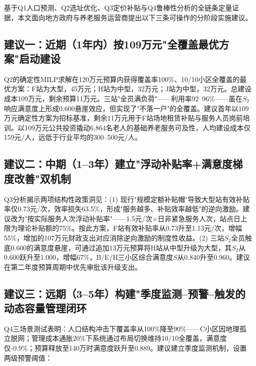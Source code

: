 
基于Q1人口预测、Q2选址优化、Q3定价补贴与Q4鲁棒性分析的全链条定量证据，本文面向地方政府与养老服务运营商提出以下三条可操作的分阶段实施建议。

\subsection{建议一：近期（1年内）按109万元"全覆盖最优方案"启动建设}

Q2的确定性MILP求解在120万元预算内获得覆盖率100\%、10/10小区全覆盖的最优方案：F站为大型，45万元；H站为中型，32万元；J站为中型，32万元。总建设成本109万元，剩余预算11万元。三站"全员满负荷"——利用率92--96\%——虽在$S_2$响应满意度上形成0.600悬崖效应，但实现了"不落一户"的全覆盖。建议首年以109万元确定性方案为招标基准，剩余11万元用于F站场地租赁补贴与服务人员岗前培训。以109万元公共投资撬动6,864名老人的基础养老服务可及性，人均建设成本仅159元/人，远低于行业平均的300--500元/人。

\subsection{建议二：中期（1--3年）建立"浮动补贴率+满意度梯度改善"双机制}

Q3分析揭示两项结构性政策洞见：(1) 现行"规模定额补贴帽"导致大型站有效补贴率仅0.73元/次，效率损失63.5\%，形成"服务越多、补贴效率越低"的逆向激励。建议改为"按实际服务人次浮动补贴率"——1.5元/次$\times$日非紧急服务人次，站点日上限为理论补贴额的75\%。按此方案，F站有效补贴率从0.73升至1.13元/次，增幅55\%，增加的107万元财政支出对应消除逆向激励的制度性收益。(2) 三站$S_2$全员触底0.600的满意度悬崖，可通过追加13万元预算将H站从中型升级为大型，其$S_2$从0.600跃升至1.000，增幅67\%，B/E/H三小区综合满意度$S$从0.840升至0.960。建议在第二年度预算周期中优先审批该升级支出。

\subsection{建议三：远期（3--5年）构建"季度监测--预警--触发的动态容量管理闭环}

Q4三场景测试表明：人口结构冲击下覆盖率从100\%降至90\%——C小区因地理孤立脱网；管理成本通胀20\%下系统通过布局切换维持10/10全覆盖，满意度仅-0.9\%；预算释放至140万时满意度跃升至0.889。建议建立季度监测机制，设置两级预警阈值：

